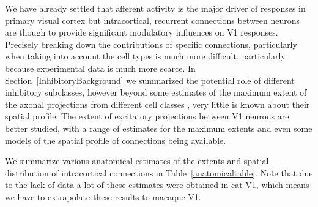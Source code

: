 We have already settled that afferent activity is the major driver of
responses in primary visual cortex but intracortical, recurrent
connections between neurons are though to provide significant
modulatory influences on V1 responses. Precisely breaking down the
contributions of specific connections, particularly when taking into
account the cell types is much more difficult, particularly because
experimental data is much more scarce. In
Section~\ref{InhibitoryBackground} we summarized the potential role of
different inhibitory subclasses, however beyond some estimates of the
maximum extent of the axonal projections from different cell classes
\citep{Kisvarday1993, Kisvarday1997a, Budd2001, Buzas2001}, very
little is known about their spatial profile. The extent of excitatory
projections between V1 neurons are better studied, with a range of
estimates for the maximum extents \citep{Angelucci2002} and even some
models of the spatial profile of connections \citep{Buzas2006} being
available.

We summarize various anatomical estimates of the extents and spatial
distribution of intracortical connections in
Table~\ref{anatomicaltable}. Note that due to the lack of data a lot
of these estimates were obtained in cat V1, which means we have to
extrapolate these results to macaque V1.

